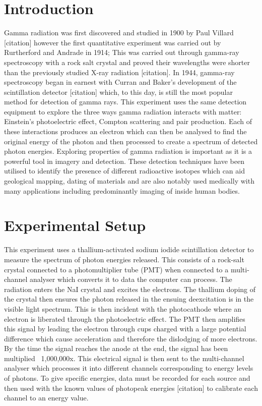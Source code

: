 \documentclass[12pt, a4paper]{article}
\begin{document}
\section{Introduction}
Gamma radiation was first discovered and studied in 1900 by Paul Villard [citation] however the first quantitative experiment was carried out by Rurtherford and Andrade in 1914; This was carried out through gamma-ray spectroscopy with a rock salt crystal and proved their wavelengths were shorter than the previously studied X-ray radiation [citation]. In 1944, gamma-ray spectroscopy began in earnest with Curran and Baker’s development of the scintillation detector [citation] which, to this day, is still the most popular method for detection of gamma rays. This experiment uses the same detection equipment to explore the three ways gamma radiation interacts with matter: Einstein’s photoelectric effect, Compton scattering and pair production. Each of these interactions produces an electron which can then be analysed to find the original energy of the photon and then processed to create a spectrum of detected photon energies. Exploring properties of gamma radiation is important as it is a powerful tool in imagery and detection. These detection techniques have been utilised to identify the presence of different radioactive isotopes which can aid geological mapping, dating of materials and are also notably used medically with many applications including predominantly imaging of inside human bodies.

\section{Experimental Setup}
This experiment uses a thallium-activated sodium iodide scintillation detector to measure the spectrum of photon energies released. This consists of a rock-salt crystal connected to a photomultiplier tube (PMT) when connected to a multi-channel analyser which converts it to data the computer can process. 
The radiation enters the NaI crystal and excites the electrons. The thallium doping of the crystal then ensures the photon released in the ensuing deexcitation is in the visible light spectrum. This is then incident with the photocathode where an electron is liberated through the photoelectric effect. The PMT then amplifies this signal by leading the electron through cups charged with a large potential difference which cause acceleration and therefore the dislodging of more electrons. By the time the signal reaches the anode at the end, the signal has been multiplied ~1,000,000x.
This electrical signal is then sent to the multi-channel analyser which processes it into different channels corresponding to energy levels of photons. To give specific energies, data must be recorded for each source and then used with the known values of photopeak energies [citation] to calibrate each channel to an energy value.
\end{document}

